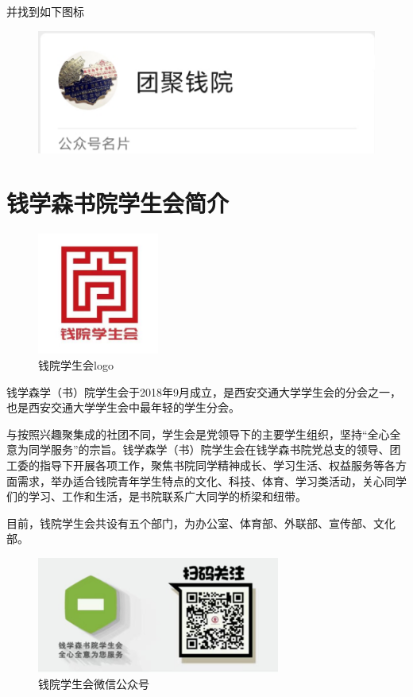 \documentclass[
decoration,  %
]{qyxf-book}
\begin{document}
    并找到如下图标

	\begin{figure}[H]
		\centering
		\includegraphics[]{tjqy.png}
	\end{figure}

	\section{钱学森书院学生会简介}
	
	\begin{figure}[htbp]
		\centering
		\includegraphics[width=4cm]{pics/qyxsh_logo.png}
		\setlength{\abovecaptionskip}{-0.2cm}
		\setlength{\belowcaptionskip}{0.2cm}
		\caption*{钱院学生会logo}
	\end{figure}
	
	钱学森学（书）院学生会于2018年9月成立，是西安交通大学学生会的分会之一，也是西安交通大学学生会中最年轻的学生分会。
	
	与按照兴趣聚集成的社团不同，学生会是党领导下的主要学生组织，坚持“全心全意为同学服务”的宗旨。钱学森学（书）院学生会在钱学森书院党总支的领导、团工委的指导下开展各项工作，聚焦书院同学精神成长、学习生活、权益服务等各方面需求，举办适合钱院青年学生特点的文化、科技、体育、学习类活动，关心同学们的学习、工作和生活，是书院联系广大同学的桥梁和纽带。
	
	目前，钱院学生会共设有五个部门，为办公室、体育部、外联部、宣传部、文化部。
	
	\begin{figure}[htbp]
		\centering
		\includegraphics[width=8cm]{pics/wechater.png}
		\setlength{\abovecaptionskip}{0.0cm}
		\setlength{\belowcaptionskip}{0.2cm}
		\caption*{钱院学生会微信公众号}
	\end{figure}
	
\end{document}
